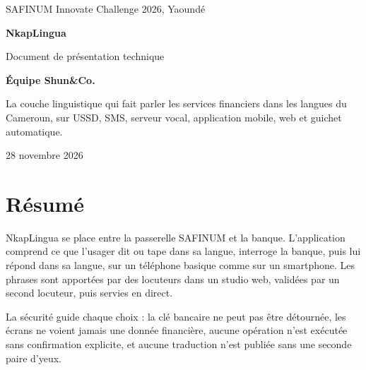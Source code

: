 \documentclass[11pt,a4paper]{article}
\begin{document}
\begin{titlepage}
\vspace*{0.6cm}
{\color{white}\large SAFINUM Innovate Challenge 2026, Yaoundé\par}
\vspace{1.4cm}
{\color{white}\fontsize{34}{40}\selectfont\bfseries NkapLingua\par}
\vspace{0.4cm}
{\color{white}\LARGE Document de présentation technique\par}
\vspace{5.2cm}

\begin{tcolorbox}[enhanced, colback=soft, colframe=soft, arc=4pt, left=16pt, right=16pt, top=14pt, bottom=14pt]
\end{tcolorbox}

\vspace{1.4cm}
{\Large\bfseries Équipe Shun\&Co.\par}
\vspace{0.3cm}
{\large\color{muted} La couche linguistique qui fait parler les services financiers dans les langues du Cameroun, sur USSD, SMS, serveur vocal, application mobile, web et guichet automatique.\par}
\vfill
{\color{muted}28 novembre 2026}
\end{titlepage}

\section*{Résumé}
NkapLingua se place entre la passerelle SAFINUM et la banque. L'application comprend ce que l'usager dit ou tape dans sa langue, interroge la banque, puis lui répond dans sa langue, sur un téléphone basique comme sur un smartphone. Les phrases sont apportées par des locuteurs dans un studio web, validées par un second locuteur, puis servies en direct.

La sécurité guide chaque choix : la clé bancaire ne peut pas être détournée, les écrans ne voient jamais une donnée financière, aucune opération n'est exécutée sans confirmation explicite, et aucune traduction n'est publiée sans une seconde paire d'yeux.
\end{document}
